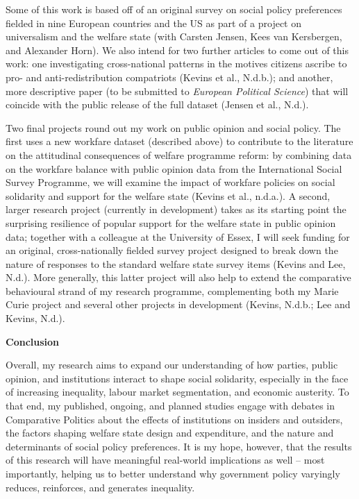 \documentclass[letterpaper]{scrartcl}
\begin{document}
  Some of this work is based off of an original survey on social policy preferences fielded in nine European countries and the US as part of a project on universalism and the welfare state (with Carsten Jensen, Kees van Kersbergen, and Alexander Horn). We also intend for two further articles to come out of this work: one investigating cross-national patterns in the motives citizens ascribe to pro- and anti-redistribution compatriots (Kevins et al., N.d.b.); and another, more descriptive paper (to be submitted to \textit{European Political Science}) that will coincide with the public release of the full dataset (Jensen et al., N.d.).

  Two final projects round out my work on public opinion and social policy. The first uses a new workfare dataset (described above) to contribute to the literature on the attitudinal consequences of welfare programme reform: by combining data on the workfare balance with public opinion data from the International Social Survey Programme, we will examine the impact of workfare policies on social solidarity and support for the welfare state (Kevins et al., n.d.a.). A second, larger research project (currently in development) takes as its starting point the surprising resilience of popular support for the welfare state in public opinion data; together with a colleague at the University of Essex, I will seek funding for an original, cross-nationally fielded survey project designed to break down the nature of responses to the standard welfare state survey items (Kevins and Lee, N.d.). More generally, this latter project will also help to extend the comparative behavioural strand of my research programme, complementing both my Marie Curie project and several other projects in development (Kevins, N.d.b.; Lee and Kevins, N.d.).

  \textbf{Conclusion}
  \vspace{-1em}

  Overall, my research aims to expand our understanding of how parties, public opinion, and institutions interact to shape social solidarity, especially in the face of increasing inequality, labour market segmentation, and economic austerity. To that end, my published, ongoing, and planned studies engage with debates in Comparative Politics about the effects of institutions on insiders and outsiders, the factors shaping welfare state design and expenditure, and the nature and determinants of social policy preferences. It is my hope, however, that the results of this research will have meaningful real-world implications as well -- most importantly, helping us to better understand why government policy varyingly reduces, reinforces, and generates inequality.
\end{document}
